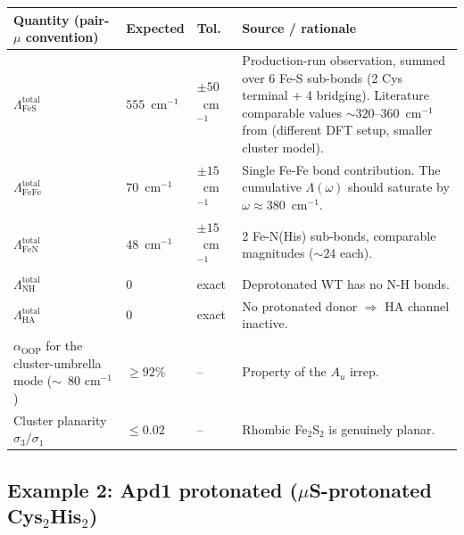 \documentclass[10pt,a4paper,twoside]{article}
\newcommand{\OOP}{\mathrm{OOP}}
\begin{document}
\begin{longtable}{p{} p{} p{} p{}}
\toprule
\textbf{Quantity (pair-$\mu$ convention)} & \textbf{Expected} & \textbf{Tol.} & \textbf{Source / rationale} \\
\midrule
$\Lambda_\text{FeS}^\text{total}$
                          & $555$~cm$^{-1}$  & $\pm 50$~cm$^{-1}$
                          & Production-run observation, summed over
                            6 Fe-S sub-bonds (2 Cys terminal + 4
                            bridging). Literature comparable values
                            $\sim 320\text{--}360$~cm$^{-1}$ from
                            \cite{Gee2021} (different DFT setup, smaller
                            cluster model). \\
$\Lambda_\text{FeFe}^\text{total}$
                          & $70$~cm$^{-1}$   & $\pm 15$~cm$^{-1}$
                          & Single Fe-Fe bond contribution. The
                            cumulative $\Lambda(\omega)$ should
                            saturate by $\omega \approx 380$~cm$^{-1}$. \\
$\Lambda_\text{FeN}^\text{total}$
                          & $48$~cm$^{-1}$   & $\pm 15$~cm$^{-1}$
                          & 2 Fe-N(His) sub-bonds, comparable
                            magnitudes ($\sim 24$ each). \\
$\Lambda_\text{NH}^\text{total}$
                          & 0                & exact
                          & Deprotonated WT has no N-H bonds. \\
$\Lambda_\text{HA}^\text{total}$
                          & 0                & exact
                          & No protonated donor $\Rightarrow$ HA
                            channel inactive. \\
$\alpha_{\OOP}$ for the cluster-umbrella mode ($\sim$~80 cm$^{-1}$)
                          & $\geq 92\%$      & --
                          & Property of the $A_u$ irrep. \\
Cluster planarity $\sigma_3/\sigma_1$
                          & $\leq 0.02$      & --
                          & Rhombic Fe$_2$S$_2$ is genuinely planar. \\
\bottomrule
\end{longtable}

\subsection{Example 2: Apd1 protonated ($\mu$S-protonated Cys$_2$His$_2$)}
\end{document}
